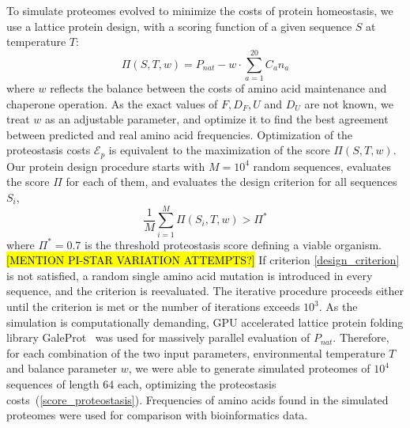 \documentclass[10pt,letterpaper]{article}
\begin{document}
To simulate proteomes evolved to minimize the costs of protein homeostasis, we use a lattice protein design, with a scoring function of a given sequence $S$ at temperature $T$:
\begin{equation}
	\label{score_proteostasis}
	\Pi(S,T,w) = P_{nat} - w\cdot\sum\limits_{a=1}^{20}C_{a}n_{a}
\end{equation}
where $w$ reflects the balance between the costs of amino acid maintenance and chaperone operation. As the exact values of $F,D_{F},U$ and $D_{U}$ are not known, we treat $w$ as an adjustable parameter, and optimize it to find the best agreement between predicted and real amino acid frequencies. Optimization of the proteostasis costs $\mathcal{E}_{p}$ is equivalent to the maximization of the score $\Pi(S,T,w)$. Our protein design procedure starts with $M=10^{4}$ random sequences, evaluates the score $\Pi$ for each of them, and evaluates the design criterion for all sequences $S_i$,
\begin{equation}
	\label{design_criterion}
	\frac{1}{M}\sum\limits_{i=1}^{M}\Pi(S_{i},T,w) > \Pi^*
\end{equation}
where $\Pi^*=0.7$ is the threshold proteostasis score defining a viable organism. \hl{[MENTION PI-STAR VARIATION ATTEMPTS?]} If criterion \eqref{design_criterion} is not satisfied,  a random single amino acid mutation is introduced in every sequence, and the criterion is reevaluated. The iterative procedure proceeds either until the criterion is met or the number of iterations exceeds $10^{3}$. As the simulation is computationally demanding, GPU accelerated lattice protein folding library GaleProt~\cite{Venev2015Massively} was used for massively parallel evaluation of $P_{nat}$. Therefore, for each combination of the two input parameters, environmental temperature $T$ and balance parameter $w$, we were able to generate simulated proteomes of $10^4$ sequences of length 64 each, optimizing the proteostasis costs~(\ref{score_proteostasis}). Frequencies of amino acids found in the simulated proteomes were used for comparison with bioinformatics data.
\end{document}
